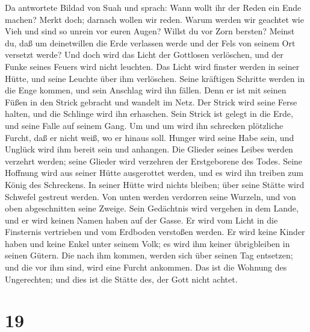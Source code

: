  Da antwortete Bildad von Suah und sprach:  Wann
wollt ihr der Reden ein Ende machen? Merkt doch; darnach wollen wir
reden.  Warum werden wir geachtet wie Vieh und sind so
unrein vor euren Augen?  Willst du vor Zorn bersten? Meinst
du, daß um deinetwillen die Erde verlassen werde und der Fels von seinem
Ort versetzt werde?  Und doch wird das Licht der Gottlosen
verlöschen, und der Funke seines Feuers wird nicht leuchten.
 Das Licht wird finster werden in seiner Hütte, und seine
Leuchte über ihm verlöschen.  Seine kräftigen Schritte
werden in die Enge kommen, und sein Anschlag wird ihn fällen.
 Denn er ist mit seinen Füßen in den Strick gebracht und
wandelt im Netz.  Der Strick wird seine Ferse halten, und
die Schlinge wird ihn erhaschen.  Sein Strick ist gelegt in
die Erde, und seine Falle auf seinem Gang.  Um und um wird
ihn schrecken plötzliche Furcht, daß er nicht weiß, wo er hinaus soll.
 Hunger wird seine Habe sein, und Unglück wird ihm bereit
sein und anhangen.  Die Glieder seines Leibes werden
verzehrt werden; seine Glieder wird verzehren der Erstgeborene des
Todes.  Seine Hoffnung wird aus seiner Hütte ausgerottet
werden, und es wird ihn treiben zum König des Schreckens. 
In seiner Hütte wird nichts bleiben; über seine Stätte wird Schwefel
gestreut werden.  Von unten werden verdorren seine Wurzeln,
und von oben abgeschnitten seine Zweige.  Sein Gedächtnis
wird vergehen in dem Lande, und er wird keinen Namen haben auf der
Gasse.  Er wird vom Licht in die Finsternis vertrieben und
vom Erdboden verstoßen werden.  Er wird keine Kinder haben
und keine Enkel unter seinem Volk; es wird ihm keiner übrigbleiben in
seinen Gütern.  Die nach ihm kommen, werden sich über
seinen Tag entsetzen; und die vor ihm sind, wird eine Furcht ankommen.
 Das ist die Wohnung des Ungerechten; und dies ist die
Stätte des, der Gott nicht achtet.

\hypertarget{section-18}{%
\section{19}\label{section-18}}

